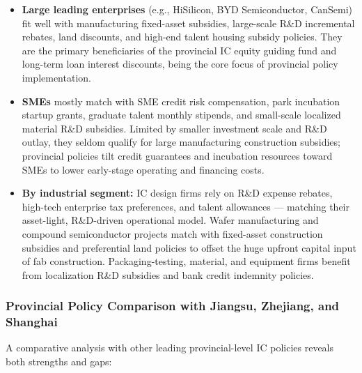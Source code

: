 \documentclass[12pt,a4paper]{article}
\begin{document}
\begin{itemize}
    \item \textbf{Large leading enterprises} (e.g., HiSilicon, BYD
          Semiconductor, CanSemi) fit well with manufacturing fixed-asset
          subsidies, large-scale R\&D incremental rebates, land discounts,
          and high-end talent housing subsidy policies. They are the
          primary beneficiaries of the provincial IC equity guiding fund
          and long-term loan interest discounts, being the core focus of
          provincial policy implementation.
    \item \textbf{SMEs} mostly match with SME credit risk compensation,
          park incubation startup grants, graduate talent monthly
          stipends, and small-scale localized material R\&D subsidies.
          Limited by smaller investment scale and R\&D outlay, they
          seldom qualify for large manufacturing construction subsidies;
          provincial policies tilt credit guarantees and incubation
          resources toward SMEs to lower early-stage operating and
          financing costs.
    \item \textbf{By industrial segment:} IC design firms rely on R\&D
          expense rebates, high-tech enterprise tax preferences, and
          talent allowances — matching their asset-light, R\&D-driven
          operational model. Wafer manufacturing and compound
          semiconductor projects match with fixed-asset construction
          subsidies and preferential land policies to offset the huge
          upfront capital input of fab construction. Packaging-testing,
          material, and equipment firms benefit from localization R\&D
          subsidies and bank credit indemnity policies.
\end{itemize}

\subsubsection{Provincial Policy Comparison with Jiangsu, Zhejiang, and Shanghai}

A comparative analysis with other leading provincial-level IC policies
reveals both strengths and gaps:
\end{document}
